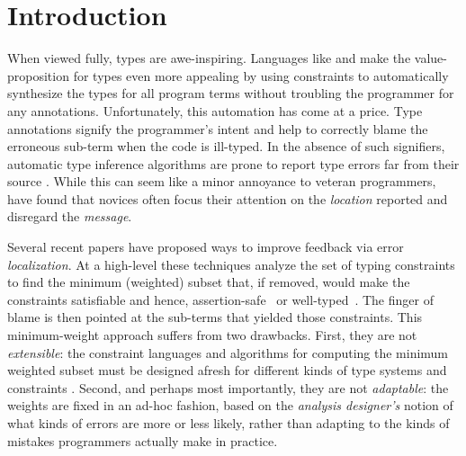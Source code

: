 \section{\textbf{Introduction}}
\label{sec:introduction}

%
When viewed fully, types are awe-inspiring.
%
Languages like \ocaml and \haskell make
the value-proposition for types even more
appealing by using constraints to automatically
synthesize the types for all program terms
without troubling the programmer for any
annotations.
%
Unfortunately, this automation has come at a price.
Type annotations signify
the programmer's intent and help to correctly
blame the erroneous sub-term when the code is
ill-typed.
%
In the absence of such signifiers, automatic
type inference algorithms are prone to report
type errors far from their source
\citep{Wand1986-nw}.
%
While this can seem like a minor annoyance to
veteran programmers, \citet{Joosten1993-yx} have found
that novices often focus their attention on the \emph{location}
reported and disregard the \emph{message}.

%
Several recent papers have proposed ways
to improve feedback via error \emph{localization}.
%
At a high-level these techniques analyze
the set of typing constraints to find
the minimum (weighted) subset that,
if removed, would make the constraints
satisfiable and hence, assertion-safe~\citep{Jose:2011}
or well-typed~\citep{Zhang2014-lv,Loncaric2016-uk,Chen2014-gd,Pavlinovic2014-mr}.
The finger of blame is then pointed at the
sub-terms that yielded those constraints.
%
This minimum-weight approach suffers
from two drawbacks.
%
First, they are not \emph{extensible}:
the constraint languages and algorithms for computing
the minimum weighted subset must be
designed afresh for different kinds
of type systems and constraints \citep{Loncaric2016-uk}.
%
Second, and perhaps most importantly,
they are not \emph{adaptable}: the
weights are fixed in an ad-hoc fashion, based on the
\emph{analysis designer's} notion
of what kinds of errors are more
or less likely, rather than
adapting to the kinds of mistakes
programmers actually make in practice.

